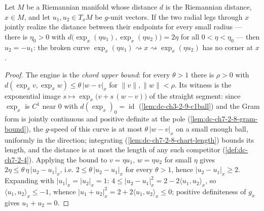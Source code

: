 \begin{lemma}
  \label{lem:dc-ch3-3-9-corner}


  Let $M$ be a Riemannian manifold whose distance $d$ is the Riemannian
  distance, $x\in M$, and let $u_1,u_2\in T_xM$ be $g$-unit vectors. If the
  two radial legs through $x$ jointly realize the distance between their
  endpoints for every small radius — there is $\eta_0>0$ with
  $d\big(\exp_x(\eta u_1),\exp_x(\eta u_2)\big)=2\eta$ for all
  $0<\eta<\eta_0$ — then $u_2=-u_1$: the broken curve
  $\exp_x(\eta u_1)\rightsquigarrow x\rightsquigarrow\exp_x(\eta u_2)$ has no
  corner at $x$.
\end{lemma}
\begin{proof}
  \sketch

  The engine is the \emph{chord upper bound}: for every $\theta>1$ there
  is $\rho>0$ with $d(\exp_x v,\exp_x w)\le\theta\,|w-v|_x$ for
  $\|v\|,\|w\|<\rho$. Its witness is the exponential image
  $s\mapsto\exp_x\big(v+s\,(w-v)\big)$ of the straight segment: since
  $\exp_x$ is $C^1$ near $0$ with $d(\exp_x)_0=\operatorname{id}$
  (\cref{lem:dc-ch3-2-9-c1ball}) and the Gram form is jointly continuous
  and positive definite at the pole (\cref{lem:dc-ch7-2-8-gram-bound}), the
  $g$-speed of this curve is at most $\theta\,|w-v|_x$ on a small enough
  ball, uniformly in the direction; integrating
  (\cref{lem:dc-ch7-2-8-chart-length}) bounds its length, and the distance
  is at most the length of any such competitor (\cref{def:dc-ch7-2-4}).
  Applying the bound to $v=\eta u_1$, $w=\eta u_2$ for small $\eta$ gives
  $2\eta\le\theta\,\eta\,|u_2-u_1|_x$, i.e. $2\le\theta\,|u_2-u_1|_x$ for
  every $\theta>1$, hence $|u_2-u_1|_x\ge2$. Expanding with
  $|u_1|_x=|u_2|_x=1$:
  $4\le|u_2-u_1|_x^2=2-2\langle u_1,u_2\rangle_x$, so
  $\langle u_1,u_2\rangle_x\le-1$, whence
  $|u_1+u_2|_x^2=2+2\langle u_1,u_2\rangle_x\le0$; positive definiteness of
  $g_x$ gives $u_1+u_2=0$.
\end{proof}

